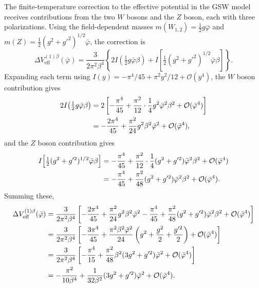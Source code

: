 The finite-temperature correction to the effective potential in the GSW
model receives contributions from the two $W$ bosons and the $Z$ boson,
each with three polarizations. Using the field-dependent masses
$m(W_{1,2}) = \frac{1}{2}g\bar\varphi$ and
$m(Z) = \frac{1}{2}(g^2+g'^2)^{1/2}\bar\varphi$, the correction is
\begin{equation}
	\Delta V_{\text{eff}}^{(1)\beta}(\bar\varphi)
	= \frac{3}{2\pi^2\beta^4}\left\{
	2I\!\left(\tfrac{1}{2}g\bar\varphi\beta\right)
	+ I\!\left[\tfrac{1}{2}(g^2+g'^2)^{1/2}\bar\varphi\beta\right]
	\right\}.
\end{equation}
Expanding each term using $I(y) = -\pi^4/45 + \pi^2 y^2/12 +
	\mathcal{O}(y^4)$, the $W$ boson contribution gives
\begin{align}
	2I\!\left(\tfrac{1}{2}g\bar\varphi\beta\right)
	 & = 2\left[-\frac{\pi^4}{45}
		      + \frac{\pi^2}{12}\cdot\frac{1}{4}g^2\bar\varphi^2\beta^2
		      + \mathcal{O}(\bar\varphi^4)\right] \notag \\
	 & = -\frac{2\pi^4}{45}
	+ \frac{\pi^2}{24}g^2\beta^2\bar\varphi^2
	+ \mathcal{O}(\bar\varphi^4),
\end{align}
and the $Z$ boson contribution gives
\begin{align}
	I\!\left[\tfrac{1}{2}(g^2+g'^2)^{1/2}\bar\varphi\beta\right]
	 & = -\frac{\pi^4}{45}
	+ \frac{\pi^2}{12}\cdot\frac{1}{4}(g^2+g'^2)
	\bar\varphi^2\beta^2
	+ \mathcal{O}(\bar\varphi^4) \notag \\
	 & = -\frac{\pi^4}{45}
	+ \frac{\pi^2}{48}(g^2+g'^2)\bar\varphi^2\beta^2
	+ \mathcal{O}(\bar\varphi^4).
\end{align}
Summing these,
\begin{align}
	\Delta V_{\text{eff}}^{(1)\beta}(\bar\varphi)
	 & = \frac{3}{2\pi^2\beta^4}\left[
		                            -\frac{2\pi^4}{45}
		                            + \frac{\pi^2}{24}g^2\beta^2\bar\varphi^2
		                            - \frac{\pi^4}{45}
		                            + \frac{\pi^2}{48}(g^2+g'^2)\bar\varphi^2\beta^2
		                            + \mathcal{O}(\bar\varphi^4)\right] \notag  \\
	 & = \frac{3}{2\pi^2\beta^4}\left[
		                            -\frac{3\pi^4}{45}
		                            + \frac{\pi^2\beta^2\bar\varphi^2}{24}
		                            \left(g^2 + \frac{g^2}{2} + \frac{g'^2}{2}\right)
		                            + \mathcal{O}(\bar\varphi^4)\right] \notag \\
	 & = \frac{3}{2\pi^2\beta^4}\left[
		                            -\frac{\pi^4}{15}
		                            + \frac{\pi^2}{48}\beta^2(3g^2+g'^2)\bar\varphi^2
		                            + \mathcal{O}(\bar\varphi^4)\right] \notag \\
	 & = -\frac{\pi^2}{10\beta^4}
	+ \frac{1}{32\beta^2}(3g^2+g'^2)\bar\varphi^2
	+ \mathcal{O}(\bar\varphi^4).
\end{align}
